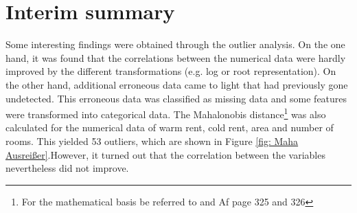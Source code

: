 \section{Interim summary}
Some interesting findings were obtained through the outlier analysis. On the one hand, it was found that the correlations between the numerical data were hardly improved by the different transformations (e.g. log or root representation). On the other hand, additional erroneous data came to light that had previously gone undetected. This erroneous data was classified as missing data and some features were transformed into categorical data. The Mahalonobis distance\footnote{For the mathematical basis be referred to \cite{Mahalonobis} and \cite{Mahalonobis2} Af page 325 and 326} was also calculated for the numerical data of warm rent, cold rent, area and number of rooms. This yielded 53 outliers, which are shown in Figure \ref{fig: Maha Ausreißer}.However, it turned out that the correlation between the variables nevertheless did not improve. 

